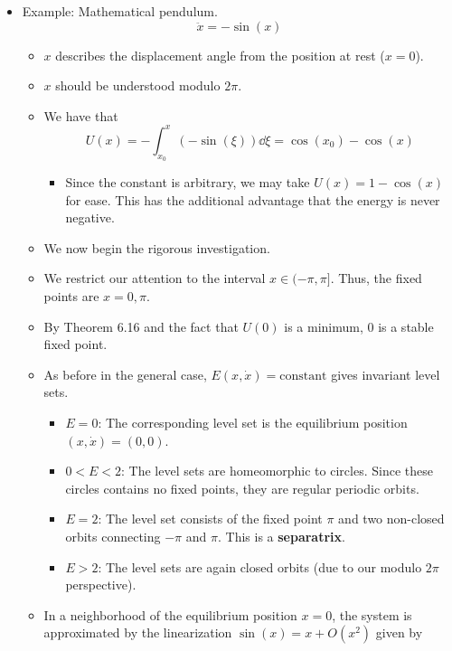 \documentclass[../notes.tex]{subfiles}
\begin{document}
\begin{itemize}
    \item Example: Mathematical pendulum.
    \begin{equation*}
        \ddot{x} = -\sin(x)
    \end{equation*}
    \begin{itemize}
        \item $x$ describes the displacement angle from the position at rest ($x=0$).
        \item $x$ should be understood modulo $2\pi$.
        \item We have that
        \begin{equation*}
            U(x) = -\int_{x_0}^x(-\sin(\xi))\dd\xi
            = \cos(x_0)-\cos(x)
        \end{equation*}
        \begin{itemize}
            \item Since the constant is arbitrary, we may take $U(x)=1-\cos(x)$ for ease. This has the additional advantage that the energy is never negative.
        \end{itemize}
        \item We now begin the rigorous investigation.
        \item We restrict our attention to the interval $x\in(-\pi,\pi]$. Thus, the fixed points are $x=0,\pi$.
        \item By Theorem 6.16 and the fact that $U(0)$ is a minimum, 0 is a stable fixed point.
        \item As before in the general case, $E(x,\dot{x})=\text{constant}$ gives invariant level sets.
        \begin{itemize}
            \item $E=0$: The corresponding level set is the equilibrium position $(x,\dot{x})=(0,0)$.
            \item $0<E<2$: The level sets are homeomorphic to circles. Since these circles contains no fixed points, they are regular periodic orbits.
            \item $E=2$: The level set consists of the fixed point $\pi$ and two non-closed orbits connecting $-\pi$ and $\pi$. This is a \textbf{separatrix}.
            \item $E>2$: The level sets are again closed orbits (due to our modulo $2\pi$ perspective).
        \end{itemize}
        \item In a neighborhood of the equilibrium position $x=0$, the system is approximated by the linearization $\sin(x)=x+O(x^2)$ given by

\end{itemize}
\end{itemize}
\end{document}
